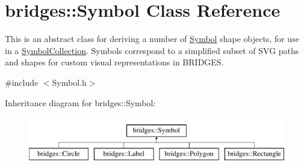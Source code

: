 \hypertarget{classbridges_1_1_symbol}{}\section{bridges\+:\+:Symbol Class Reference}
\label{classbridges_1_1_symbol}


This is an abstract class for deriving a number of \hyperlink{classbridges_1_1_symbol}{Symbol} shape objects, for use in a \hyperlink{classbridges_1_1_symbol_collection}{Symbol\+Collection}. Symbols correspond to a simplified subset of S\+V\+G paths and shapes for custom visual representations in B\+R\+I\+D\+G\+E\+S.  




{\ttfamily \#include $<$Symbol.\+h$>$}

Inheritance diagram for bridges\+:\+:Symbol\+:\begin{figure}[H]
\begin{center}
\leavevmode
\includegraphics[height=2.000000cm]{classbridges_1_1_symbol}
\end{center}
\end{figure}
